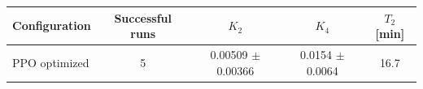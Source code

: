 \begin{tabular}{lcccc}
\toprule
Configuration & Successful runs & $K_2$ & $K_4$ & $T_2$ [min] \\
\midrule
PPO optimized & 5 & 0.00509 $\pm$ 0.00366 & 0.0154 $\pm$ 0.0064 & 16.7 \\
\bottomrule
\end{tabular}
